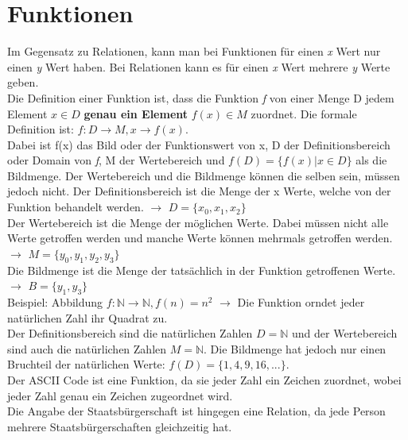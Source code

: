 \documentclass{article}
\newcommand{\N}{\mathbb{N}}
\begin{document}
	 \section{Funktionen}
	 Im Gegensatz zu Relationen, kann man bei Funktionen für einen \textit{x} Wert nur einen \textit{y} Wert haben. Bei Relationen kann es für einen \textit{x} Wert mehrere \textit{y} Werte geben. \\
	 Die Definition einer Funktion ist, dass die Funktion \textit{f} von einer Menge D jedem Element $x\in D$ \textbf{genau ein Element} $f(x)\in M$ zuordnet. Die formale Definition ist: $f:D \rightarrow M, x \rightarrow f(x)$. \\
	 Dabei ist f(x) das Bild oder der Funktionswert von x, D der Definitionsbereich oder Domain von \textit{f}, M der Wertebereich und $f(D)=\{f(x)|x\in D\}$ als die Bildmenge. Der Wertebereich und die Bildmenge können die selben sein, müssen jedoch nicht.
	 Der Definitionsbereich ist die Menge der x Werte, welche von der Funktion behandelt werden. $\to$ $D=\{x_0, x_1, x_2\}$ \\
	 Der Wertebereich ist die Menge der möglichen Werte. Dabei müssen nicht alle Werte getroffen werden und manche Werte können mehrmals getroffen werden. $\to$ $M=\{y_0,y_1,y_2,y_3\}$ \\
	 Die Bildmenge ist die Menge der tatsächlich in der Funktion getroffenen Werte. $\to$ $B=\{y_1, y_3\}$ \\
	 Beispiel: Abbildung $f:\N \rightarrow \N, f(n)=n^2$ $\to$ Die Funktion orndet jeder natürlichen Zahl ihr Quadrat zu. \\
	 Der Definitionsbereich sind die natürlichen Zahlen $D=\N$ und der Wertebereich sind auch die natürlichen Zahlen $M=\N$. Die Bildmenge hat jedoch nur einen Bruchteil der natürlichen Werte: $f(D)=\{1,4,9,16,...\}$. \\
	 Der ASCII Code ist eine Funktion, da sie jeder Zahl ein Zeichen zuordnet, wobei jeder Zahl genau ein Zeichen zugeordnet wird. \\
	 Die Angabe der Staatsbürgerschaft ist hingegen eine Relation, da jede Person mehrere Staatsbürgerschaften gleichzeitig hat.
\end{document}
